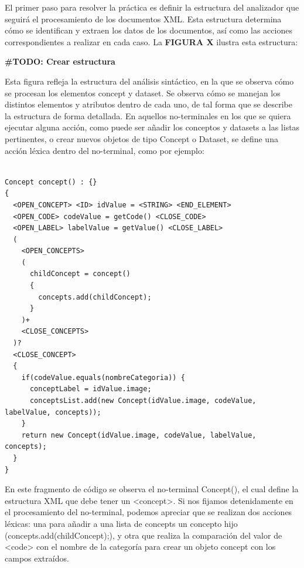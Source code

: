 El primer paso para resolver la práctica es definir la estructura del analizador que seguirá el procesamiento de los documentos XML. Esta estructura determina cómo se identifican y extraen los datos de los documentos, así como las acciones correspondientes a realizar en cada caso. La \textbf{FIGURA X} ilustra esta estructura:




\textbf{\#TODO: Crear estructura}

Esta figura refleja la estructura del análisis sintáctico, en la que se observa cómo se procesan los elementos concept y dataset. Se observa cómo se manejan los distintos elementos y atributos dentro de cada uno, de tal forma que se describe la estructura de forma detallada. En aquellos no-terminales en los que se quiera ejecutar alguna acción, como puede ser añadir los conceptos y datasets a las listas pertinentes, o crear nuevos objetos de tipo Concept o Dataset, se define una acción léxica dentro del no-terminal, como por ejemplo:

\begin{lstlisting}

Concept concept() : {}
{
  <OPEN_CONCEPT> <ID> idValue = <STRING> <END_ELEMENT>
  <OPEN_CODE> codeValue = getCode() <CLOSE_CODE>
  <OPEN_LABEL> labelValue = getValue() <CLOSE_LABEL>
  (
    <OPEN_CONCEPTS>
    (
      childConcept = concept()
      {
        concepts.add(childConcept);
      }
    )+
    <CLOSE_CONCEPTS>
  )?
  <CLOSE_CONCEPT>
  {
    if(codeValue.equals(nombreCategoria)) {
      conceptLabel = idValue.image;
      conceptsList.add(new Concept(idValue.image, codeValue, labelValue, concepts));
    }
    return new Concept(idValue.image, codeValue, labelValue, concepts);
  }
}

\end{lstlisting}

En este fragmento de código se observa el no-terminal Concept(), el cual define la estructura XML que debe tener un <concept>. Si nos fijamos detenidamente en el procesamiento del no-terminal, podemos apreciar que se realizan dos acciones léxicas: una para añadir a una lista de concepts un concepto hijo (concepts.add(childConcept);), y otra que realiza la comparación del valor de <code> con el nombre de la categoría para crear un objeto concept con los campos extraídos.

